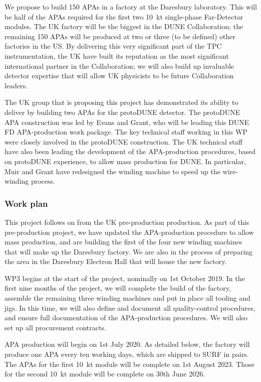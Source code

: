 We propose to build 150 APAs in a factory at the Daresbury laboratory. This will be half of the APAs required for the first two \SI{10}{\kilo\tonne} single-phase Far-Detector modules. The UK factory will be the biggest in the DUNE Collaboration; the remaining 150 APAs will be produced at two or three (to be defined) other factories in the US. By delivering this very significant part of the TPC instrumentation, the UK have built its reputation as the most significant international partner in the Collaboration; we will also build up invaluable detector expertise that will allow UK physicists to be future Collaboration leaders.

The UK group that is proposing this project has demonstrated its ability to deliver by building two APAs for the protoDUNE detector. The protoDUNE APA construction was led by Evans and Grant, who will be leading this DUNE FD APA-production work package. The key technical staff working in this WP were closely involved in the protoDUNE construction. The UK technical staff have also been leading the development of the APA-production procedures, based on protoDUNE experience, to allow mass production for DUNE. In particular, Muir and Grant have redesigned the winding machine to speed up the wire-winding process. 


\subsubsection{Work plan}

This project follows on from the UK pre-production production. As part of this pre-production project, we have updated the APA-production procedure to allow mass production, and are building the first of the four new winding machines that will make up the Daresbury factory. We are also in the process of preparing the area in the Daresbury Electron Hall that will house the new factory.

WP3 begins at the start of the project, nominally on 1st October 2019. In the first nine months of the project, we will complete the build of the factory, assemble the remaining three winding machines and put in place all tooling and jigs. In this time, we will also define and document all quality-control procedures, and ensure full documentation of the APA-production procedures. We will also set up all procurement contracts.

APA production will begin on 1st July 2020. As detailed below, the factory will produce one APA every ten working days, which are shipped to SURF in pairs. The APAs for the first \SI{10}{\kilo\tonne} module will be complete on 1st August 2023. Those for the second \SI{10}{\kilo\tonne} module will be complete on 30th June 2026.


